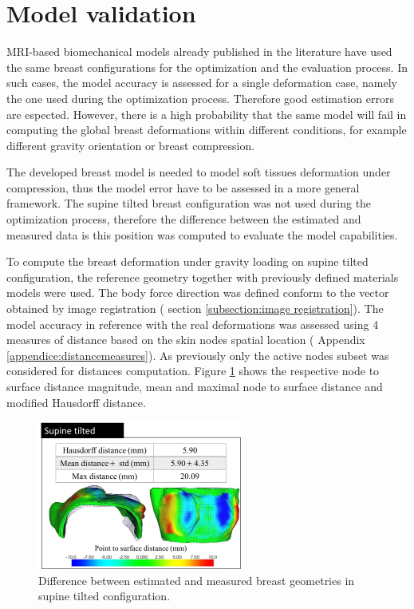 \section{Model validation}\label{chapter:modelvalidation}

MRI-based biomechanical models already published in the literature have used the same breast configurations for the optimization and the evaluation process. In such cases, the model accuracy is assessed for a single deformation case, namely the one used during the optimization process. Therefore good estimation errors are espected. However, there is a high probability that the same model will fail in computing the global breast deformations within different conditions, for example different gravity orientation or breast compression. 

The developed breast model is needed to model soft tissues deformation under compression, thus the model error have to be assessed in a more general framework. The supine tilted breast configuration was not used during the optimization process, therefore the difference between the estimated and measured data is this position was computed to evaluate the model capabilities. 

To compute the breast deformation under gravity loading on supine tilted configuration, the reference geometry together with previously defined materials models were used. The body force direction was defined conform to the vector obtained by image registration ( section \ref{subsection:image registration}). The model accuracy in reference with the real deformations was assessed using 4 measures of distance based on the skin nodes spatial location ( Appendix \ref{appendice:distancemeasures}). As previously only the active nodes subset was considered for distances computation. Figure \ref{fig:modelevaluation} shows the respective node to surface distance magnitude, mean and maximal node to surface distance and modified Hausdorff distance.
 
\begin{figure}[!h]
\centering
\includegraphics[width=0.6\textwidth,keepaspectratio]{figures/modelevaluation.png} 
\caption{Difference between estimated and measured breast geometries in supine tilted configuration.}\label{fig:modelevaluation}
\end{figure}

